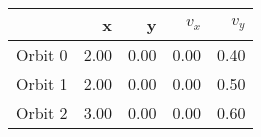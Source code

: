 \begin{tabular}{lrrrr}
\toprule
{} &    x &    y &  $v_x$ &  $v_y$ \\
\midrule
Orbit 0 & 2.00 & 0.00 &   0.00 &   0.40 \\
Orbit 1 & 2.00 & 0.00 &   0.00 &   0.50 \\
Orbit 2 & 3.00 & 0.00 &   0.00 &   0.60 \\
\bottomrule
\end{tabular}
